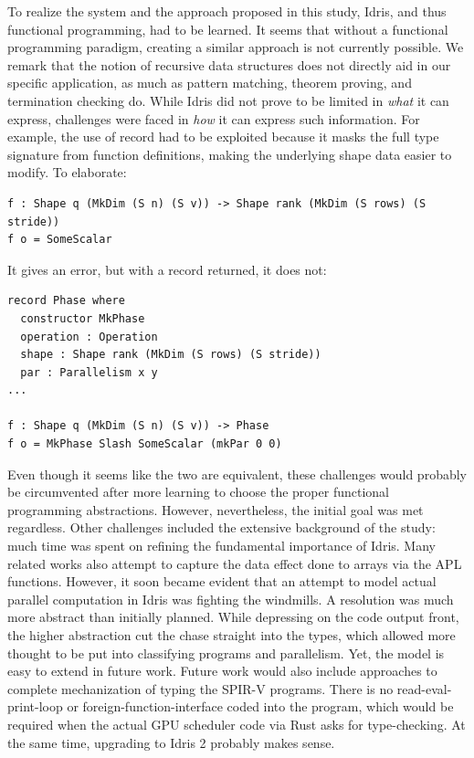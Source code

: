 \documentclass{report}
\begin{document}
To realize the system and the approach proposed in this study, Idris, and thus functional programming, had to be learned. It seems that without a functional programming paradigm, creating a similar approach is not currently possible. We remark that the notion of recursive data structures does not directly aid in our specific application, as much as pattern matching, theorem proving, and termination checking do. While Idris did not prove to be limited in \emph{what} it can express, challenges were faced in \emph{how} it can express such information. For example, the use of record had to be exploited because it masks the full type signature from function definitions, making the underlying shape data easier to modify. To elaborate:

\begin{verbatim}
f : Shape q (MkDim (S n) (S v)) -> Shape rank (MkDim (S rows) (S stride))
f o = SomeScalar
\end{verbatim}

It gives an error, but with a record returned, it does not:

\begin{verbatim}
record Phase where
  constructor MkPhase
  operation : Operation
  shape : Shape rank (MkDim (S rows) (S stride))
  par : Parallelism x y
...

f : Shape q (MkDim (S n) (S v)) -> Phase
f o = MkPhase Slash SomeScalar (mkPar 0 0)
\end{verbatim}

Even though it seems like the two are equivalent, these challenges would probably be circumvented after more learning to choose the proper functional programming abstractions. However, nevertheless, the initial goal was met regardless. Other challenges included the extensive background of the study: much time was spent on refining the fundamental importance of Idris. Many related works also attempt to capture the data effect done to arrays via the APL functions. However, it soon became evident that an attempt to model actual parallel computation in Idris was fighting the windmills. A resolution was much more abstract than initially planned. While depressing on the code output front, the higher abstraction cut the chase straight into the types, which allowed more thought to be put into classifying programs and parallelism. Yet, the model is easy to extend in future work. Future work would also include approaches to complete mechanization of typing the SPIR-V programs. There is no read-eval-print-loop or foreign-function-interface coded into the program, which would be required when the actual GPU scheduler code via Rust asks for type-checking. At the same time, upgrading to Idris 2 probably makes sense.
\end{document}
